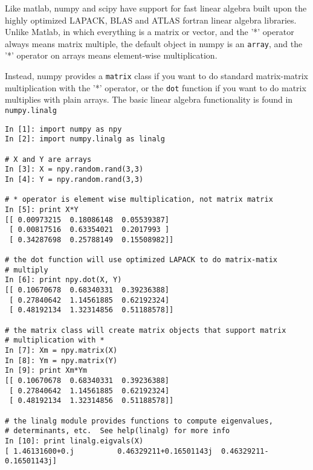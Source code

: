 Like matlab, numpy and scipy have support for fast linear algebra
built upon the highly optimized LAPACK, BLAS and ATLAS fortran linear
algebra libraries.  Unlike Matlab, in which everything is a matrix or
vector, and the '*' operator always means matrix multiple, the default
object in numpy is an \texttt{array}, and the '*' operator on arrays means
element-wise multiplication.  

Instead, numpy provides a \texttt{matrix} class if you want to do
standard matrix-matrix multiplication with the '*' operator, or the
\texttt{dot} function if you want to do matrix multiplies with plain
arrays.  The basic linear algebra functionality is found in
\texttt{numpy.linalg}

\begin{lstlisting}
In [1]: import numpy as npy
In [2]: import numpy.linalg as linalg

# X and Y are arrays
In [3]: X = npy.random.rand(3,3)
In [4]: Y = npy.random.rand(3,3)

# * operator is element wise multiplication, not matrix matrix
In [5]: print X*Y
[[ 0.00973215  0.18086148  0.05539387]
 [ 0.00817516  0.63354021  0.2017993 ]
 [ 0.34287698  0.25788149  0.15508982]]

# the dot function will use optimized LAPACK to do matrix-matix
# multiply
In [6]: print npy.dot(X, Y)
[[ 0.10670678  0.68340331  0.39236388]
 [ 0.27840642  1.14561885  0.62192324]
 [ 0.48192134  1.32314856  0.51188578]]

# the matrix class will create matrix objects that support matrix
# multiplication with *
In [7]: Xm = npy.matrix(X)
In [8]: Ym = npy.matrix(Y)
In [9]: print Xm*Ym
[[ 0.10670678  0.68340331  0.39236388]
 [ 0.27840642  1.14561885  0.62192324]
 [ 0.48192134  1.32314856  0.51188578]]

# the linalg module provides functions to compute eigenvalues,
# determinants, etc.  See help(linalg) for more info
In [10]: print linalg.eigvals(X)
[ 1.46131600+0.j          0.46329211+0.16501143j  0.46329211-0.16501143j]

\end{lstlisting}
